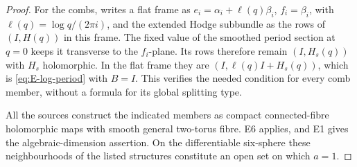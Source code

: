 \begin{proof}
For the combs, \cite[Proposition labelled \texttt{periodextension},
case (i)]{Viaclovsky2026Combs} writes a flat frame as
$e_i=\alpha_i+\ell(q)\beta_i$, $f_i=\beta_i$, with
$\ell(q)=\log q/(2\pi i)$, and the extended Hodge subbundle as
the rows of $(I,H(q))$ in this frame. The fixed value of the
smoothed period section at $q=0$ keeps it transverse to the
$f_i$-plane. Its rows therefore remain $(I,H_s(q))$ with
$H_s$ holomorphic. In the flat frame they are
$(I,\ell(q)I+H_s(q))$, which is \eqref{eq:E-log-period} with
$B=I$. This verifies the needed condition for every comb member,
without a formula for its global splitting type.

All the sources construct the indicated members as compact
connected-fibre holomorphic maps with smooth general two-torus
fibre. E6 applies, and E1 gives the algebraic-dimension assertion.
On the differentiable six-sphere these neighbourhoods of the
listed structures constitute an open set on which $a=1$.
\end{proof}



